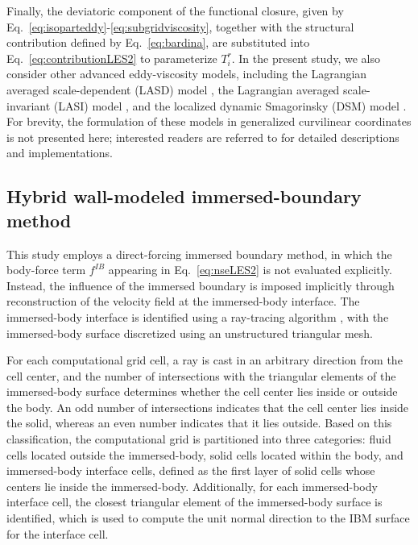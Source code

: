 \documentclass[%
superscriptaddress,
 amsmath,amssymb,
pra,
showkeys,
]{revtex4-2}
\begin{document}
Finally, the deviatoric component of the functional closure, given by Eq.~\eqref{eq:isoparteddy}-\eqref{eq:subgridviscosity}, together with the structural contribution defined by Eq.~\eqref{eq:bardina}, are substituted into Eq.~\eqref{eq:contributionLES2} to parameterize $T_i^{r}$. In the present study, we also consider other advanced eddy-viscosity models, including the Lagrangian averaged scale-dependent (LASD) model \cite{bou2005scale}, the Lagrangian averaged scale-invariant (LASI) model \cite{meneveau2000scale}, and the localized dynamic Smagorinsky (DSM) model \cite{ghosal1995dynamic}. For brevity, the formulation of these models in generalized curvilinear coordinates is not presented here; interested readers are referred to \citet{ajay2025mixed} for detailed descriptions and implementations. %

\subsection{\label{sec:methodibm} Hybrid wall-modeled immersed-boundary method} 

This study employs a direct-forcing immersed boundary method, in which the body-force term $f^{IB}$ appearing in Eq.~\ref{eq:nseLES2} is not evaluated explicitly. Instead, the influence of the immersed boundary is imposed implicitly through reconstruction of the velocity field at the immersed-body interface. The immersed-body interface is identified using a ray-tracing algorithm \cite{borazjani2008curvilinear}, with the immersed-body surface discretized using an unstructured triangular mesh. 

For each computational grid cell, a ray is cast in an arbitrary direction from the cell center, and the number of intersections with the triangular elements of the immersed-body surface determines whether the cell center lies inside or outside the body. An odd number of intersections indicates that the cell center lies inside the solid, whereas an even number indicates that it lies outside. Based on this classification, the computational grid is partitioned into three categories: fluid cells located outside the immersed-body, solid cells located within the body, and immersed-body interface cells, defined as the first layer of solid cells whose centers lie inside the immersed-body. Additionally, for each immersed-body interface cell, the closest triangular element of the immersed-body surface is identified, which is used to compute the unit normal direction to the IBM surface for the interface cell.
\end{document}

